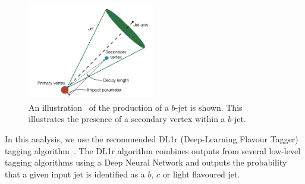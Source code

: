 \begin{figure}[h!]
 \includegraphics[width=0.5\textwidth]{figures/theoryFigs/b_tag_illustration.png}
 \centering
\caption{An illustration~\cite{Connelly2017PerformanceAC} of the production of a $b$-jet is shown. This illustrates the presence of a secondary vertex within a $b$-jet.}
\label{fig:btag-pic}
\end{figure}

In this analysis, we use the recommended DL1r (Deep-Learning Flavour Tagger) tagging algorithm~\cite{DL1r-slides}. The DL1r algorithm combines outputs from several low-level tagging algorithms using a Deep Neural Network and outputs the probability that a given input jet is identified as a $b$, $c$ or light flavoured jet.